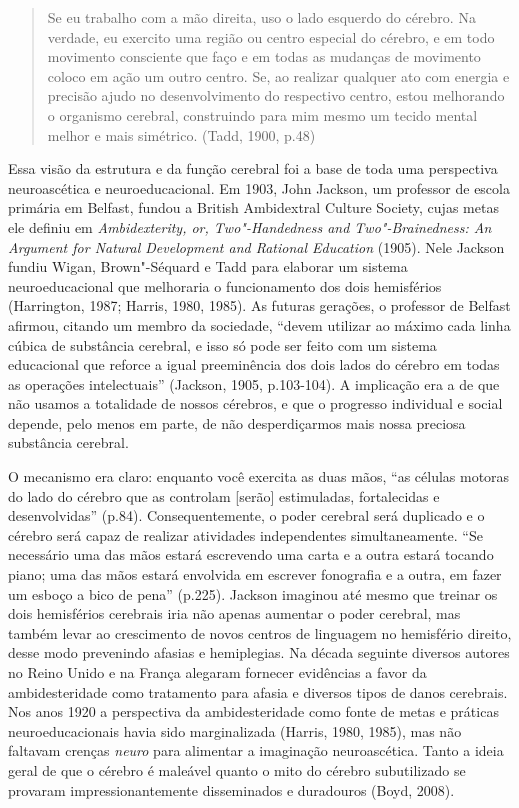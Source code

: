 \begin{quote}
Se eu trabalho com a mão direita, uso o lado esquerdo do cérebro. Na
verdade, eu exercito uma região ou centro especial do cérebro, e em todo
movimento consciente que faço e em todas as mudanças de movimento coloco
em ação um outro centro. Se, ao realizar qualquer ato com energia e
precisão ajudo no desenvolvimento do respectivo centro, estou melhorando
o organismo cerebral, construindo para mim mesmo um tecido mental melhor
e mais simétrico. (Tadd, 1900, p.48)
\end{quote}

Essa visão da estrutura e da função cerebral foi a base de toda uma
perspectiva neuroascética e neuroeducacional. Em 1903, John Jackson, um
professor de escola primária em Belfast, fundou a British Ambidextral
Culture Society, cujas metas ele definiu em \emph{Ambidexterity, or,
Two"-Handedness and Two"-Brainedness: An Argument for Natural Development
and Rational Education} (1905). Nele Jackson fundiu Wigan, Brown"-Séquard
e Tadd para elaborar um sistema neuroeducacional que melhoraria o
funcionamento dos dois hemisférios (Harrington, 1987; Harris, 1980,
1985). As futuras gerações, o professor de Belfast afirmou, citando um
membro da sociedade, ``devem utilizar ao máximo cada linha cúbica de
substância cerebral, e isso só pode ser feito com um sistema educacional
que reforce a igual preeminência dos dois lados do cérebro em todas as
operações intelectuais'' (Jackson, 1905, p.103-104). A implicação era a
de que não usamos a totalidade de nossos cérebros, e que o progresso
individual e social depende, pelo menos em parte, de não desperdiçarmos
mais nossa preciosa substância cerebral.

O mecanismo era claro: enquanto você exercita as duas mãos, ``as células
motoras do lado do cérebro que as controlam {[}serão{]} estimuladas,
fortalecidas e desenvolvidas'' (p.84). Consequentemente, o poder
cerebral será duplicado e o cérebro será capaz de realizar atividades
independentes simultaneamente. ``Se necessário uma das mãos estará
escrevendo uma carta e a outra estará tocando piano; uma das mãos estará
envolvida em escrever fonografia e a outra, em fazer um esboço a bico de
pena'' (p.225). Jackson imaginou até mesmo que treinar os dois
hemisférios cerebrais iria não apenas aumentar o poder cerebral, mas
também levar ao crescimento de novos centros de linguagem no hemisfério
direito, desse modo prevenindo afasias e hemiplegias. Na década seguinte
diversos autores no Reino Unido e na França alegaram fornecer evidências
a favor da ambidesteridade como tratamento para afasia e diversos tipos
de danos cerebrais. Nos anos 1920 a perspectiva da ambidesteridade como
fonte de metas e práticas neuroeducacionais havia sido marginalizada
(Harris, 1980, 1985), mas não faltavam crenças \emph{neuro} para
alimentar a imaginação neuroascética. Tanto a ideia geral de que o
cérebro é maleável quanto o mito do cérebro subutilizado se provaram
impressionantemente disseminados e duradouros (Boyd, 2008).

